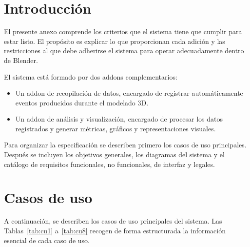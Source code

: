 
\section{Introducción}

El presente anexo comprende los criterios que el sistema tiene que cumplir para estar listo. El propósito es explicar lo que proporcionan cada adición y las restricciones al que debe adherirse el sistema para operar adecuadamente dentro de Blender.

El sistema está formado por dos addons complementarios:

\begin{itemize}
    \item Un addon de recopilación de datos, encargado de registrar automáticamente eventos producidos durante el modelado 3D.

    \item Un addon de análisis y visualización, encargado de procesar los datos registrados y generar métricas, gráficos y representaciones visuales.
\end{itemize}

Para organizar la especificación se describen primero los casos de uso principales. Después se incluyen los objetivos generales, los diagramas del sistema y el catálogo de requisitos funcionales, no funcionales, de interfaz y legales.

\section{Casos de uso}

A continuación, se describen los casos de uso principales del sistema. Las Tablas~\ref{tab:cu1} a~\ref{tab:cu8} recogen de forma estructurada la información esencial de cada caso de uso.

